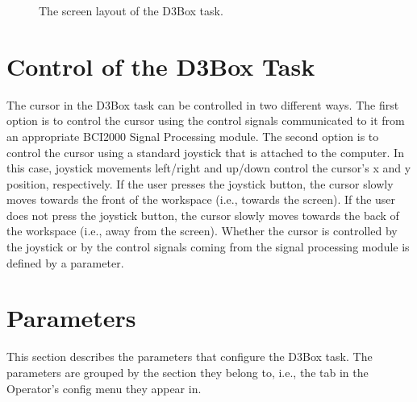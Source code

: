 \documentclass[letterpaper,oneside,12pt]{article}
\begin{document}
\begin{figure}[ht]
 \centerline{}
 \caption{The screen layout of the D3Box task.}
 \label{fig:d3boxscreen}
\end{figure}


\section{Control of the D3Box Task}

The cursor in the D3Box task can be controlled in two different ways. The first 
option is to control the cursor using the control signals communicated to it 
from an appropriate BCI2000 Signal Processing module. The second option is to 
control the cursor using a standard joystick that is attached to the computer. 
In this case, joystick movements left/right and up/down control the 
cursor's x and y position, respectively. If the user presses the joystick 
button, the cursor slowly moves towards the front of the workspace (i.e., 
towards the screen). If the user does not press the joystick button, the cursor 
slowly moves towards the back of the workspace (i.e., away from the screen). 
Whether the cursor is controlled by the joystick or by the control signals 
coming from the signal processing module is defined by a parameter.

\section{Parameters}
This section describes the parameters that configure the D3Box task.
The parameters are grouped by the section they belong to, i.e., the
tab in the Operator's config menu they appear in.
\end{document}
